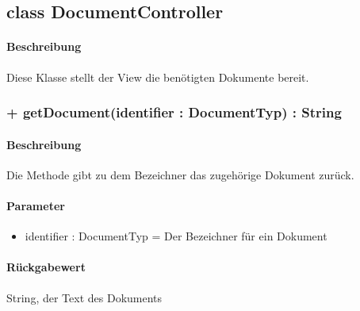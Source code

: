 \subsection{class DocumentController}
\paragraph*{Beschreibung}
Diese Klasse stellt der View die benötigten Dokumente bereit.

\subsubsection{+ getDocument(identifier : DocumentTyp) : String}%
\paragraph*{Beschreibung}
Die Methode gibt zu dem Bezeichner das zugehörige Dokument zurück.
\paragraph*{Parameter}
\begin{itemize}
    \item identifier : DocumentTyp = Der Bezeichner für ein Dokument
\end{itemize}
\paragraph*{Rückgabewert}
String, der Text des Dokuments
